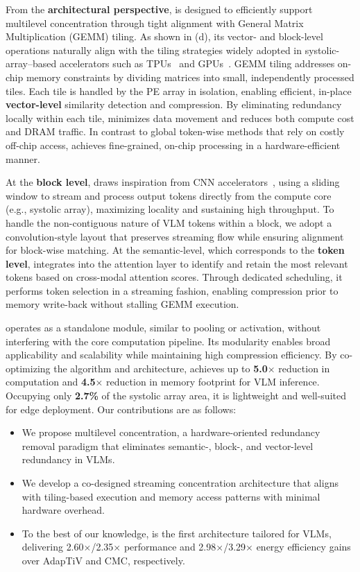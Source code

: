From the \textbf{architectural perspective}, \proj{} is designed to efficiently support multilevel concentration through tight alignment with General Matrix Multiplication (GEMM) tiling.  
As shown in (d), its vector- and block-level operations naturally align with the tiling strategies widely adopted in systolic-array–based accelerators such as TPUs~\cite{jouppi2023tpuv4} and GPUs~\cite{choquette2021nvidia}.
GEMM tiling addresses on-chip memory constraints by dividing matrices into small, independently processed tiles. 
Each tile is handled by the PE array in isolation, enabling efficient, in-place \textbf{vector-level} similarity detection and compression.
By eliminating redundancy locally within each tile, \proj{} minimizes data movement and reduces both compute cost and DRAM traffic. 
In contrast to global token-wise methods that rely on costly off-chip access, \proj{} achieves fine-grained, on-chip processing in a hardware-efficient manner.


At the \textbf{block level}, \proj{} draws inspiration from CNN accelerators~\cite{chen2016eyeriss,du2015shidiannao}, using a sliding window to stream and process output tokens directly from the compute core (e.g., systolic array), maximizing locality and sustaining high throughput. 
To handle the non-contiguous nature of VLM tokens within a block, we adopt a convolution-style layout that preserves streaming flow while ensuring alignment for block-wise matching.
At the {semantic-level, which corresponds to the \textbf{token level}}, \proj{} integrates into the attention layer to identify and retain the most relevant tokens based on cross-modal attention scores.  
Through dedicated scheduling, it performs token selection in a streaming fashion, enabling compression prior to memory write-back without stalling GEMM execution.

\proj{} operates as a standalone module, similar to pooling or activation, without interfering with the core computation pipeline.  
Its modularity enables broad applicability and scalability while maintaining high compression efficiency.  
By co-optimizing the algorithm and architecture, \proj{} achieves up to \textbf{5.0$\times$} reduction in computation and \textbf{4.5$\times$} reduction in memory footprint for VLM inference.
Occupying only {\textbf{2.7\%}} of the systolic array area, it is lightweight and well-suited for edge deployment.
{Our contributions are as follows:}
\begin{itemize}
    \item We propose {multilevel concentration}, a hardware-oriented redundancy removal paradigm that eliminates semantic-, block-, and vector-level redundancy in VLMs.

    \item We develop a co-designed {streaming concentration architecture} that aligns with tiling-based execution and memory access patterns with minimal hardware overhead.

    \item To the best of our knowledge, \proj is the first architecture tailored for VLMs, delivering {2.60$\times$}/{2.35$\times$} performance and {{2.98$\times$}/{3.29$\times$}} energy efficiency gains over AdapTiV and CMC, respectively.
\end{itemize}
